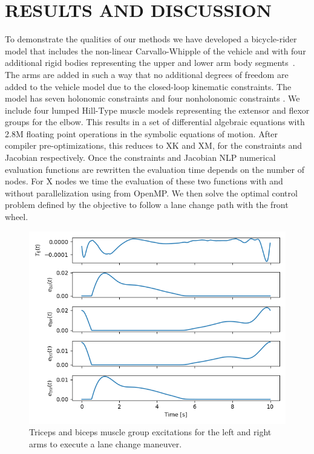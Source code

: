 \documentclass[11pt,twocolumn]{article}
\begin{document}
\section*{RESULTS AND DISCUSSION}
%
To demonstrate the qualities of our methods we have developed a bicycle-rider
model that includes the non-linear Carvallo-Whipple of the vehicle and with four
additional rigid bodies representing the upper and lower arm body
segments~\cite{Stienstra2023a}. The arms are added in such a way that no
additional degrees of freedom are added to the vehicle model due to the
closed-loop kinematic constraints. The model has seven holonomic constraints and
four nonholonomic constraints . We include four lumped Hill-Type muscle models
representing the extensor and flexor groups for the elbow. This results in a set
of differential algebraic equations with 2.8M floating point operations in the
symbolic equations of motion. After compiler pre-optimizations, this reduces to
XK and XM, for the constraints and Jacobian respectively. Once the constraints
and Jacobian NLP numerical evaluation functions are rewritten the evaluation
time depends on the number of nodes. For X nodes we time the evaluation of these
two functions with and without parallelization using from OpenMP. We then solve
the optimal control problem defined by the objective to follow a lane change
path with the front wheel.

\begin{figure}
    \centering
    \includegraphics[width=\linewidth]{figures/arm-muscle-bicycle-excitation.png}
    \caption{Triceps and biceps muscle group excitations for the left and right arms to execute a lane change maneuver.}
    \label{fig:enter-label}
\end{figure}
\end{document}
